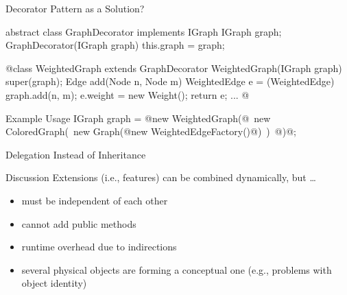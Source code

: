 \begin{frame}[fragile]{Decorator Pattern as a Solution?} %
	\begin{mycolumns}[widths={52}]
		\small
\begin{codetight}{}
abstract class GraphDecorator implements IGraph {
	IGraph graph;
	GraphDecorator(IGraph graph) {
		this.graph = graph;
	}
}
\end{codetight}
\begin{codetight}{}
@class WeightedGraph extends GraphDecorator {
	WeightedGraph(IGraph graph) {
		super(graph);
	}
	Edge add(Node n, Node m) {
		WeightedEdge e = (WeightedEdge) graph.add(n, m);
		e.weight = new Weight();
		return e;
	}
	...
}@
\end{codetight} %
	\mynextcolumn
	\end{mycolumns}
	\small
\begin{codetight}{Example Usage}
IGraph graph = @new WeightedGraph(@~new ColoredGraph(~new Graph(@new WeightedEdgeFactory()@)~)~@)@;
\end{codetight}
\end{frame}

\begin{frame}{Delegation Instead of Inheritance}
	\begin{mycolumns}[widths={55}]
		\begin{note}{Discussion}
			Extensions (i.e., features) can be combined dynamically, but \ldots
			\begin{itemize}
				\item must be independent of each other
				\item cannot add public methods
				\item runtime overhead due to indirections
				\item several physical objects are forming a conceptual one (e.g., problems with object identity)
			\end{itemize}
		\end{note}
	\mynextcolumn
	\end{mycolumns}
\end{frame}
